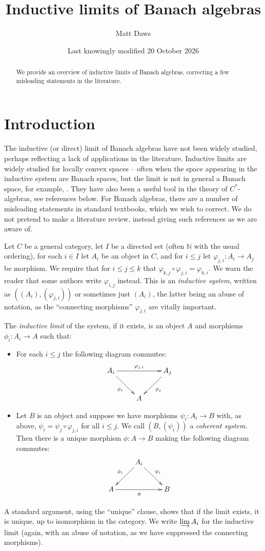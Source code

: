 \documentclass[a4paper,11pt]{article}
\title{Inductive limits of Banach algebras}
\author{Matt Daws}
\date{Last knowingly modified 20 October 2026}
\newcommand{\indlim}{\varinjlim}
\theoremstyle{definition}
\begin{document}
\maketitle

\begin{abstract}
We provide an overview of inductive limits of Banach algebras, correcting a few misleading
statements in the literature.
\end{abstract}

\tableofcontents

\section{Introduction}\label{sec:intro}

The inductive (or direct) limit of Banach algebras have not been widely studied, perhaps reflecting
a lack of applications in the literature.  Inductive limits are widely studied for locally convex
spaces -- often when the space appearing in the inductive system are Banach spaces, but the limit is
not in general a Banach space, for example, \cite[Chapter~IV, Section~5]{conway}.  They have also
been a useful tool in the theory of $C^*$-algebras, see references below.  For Banach algebras,
there are a number of misleading statements in standard textbooks, which we wish to correct.  We do
not pretend to make a literature review, instead giving such references as we are aware of.

Let $C$ be a general category, let $I$ be a directed set (often $\mathbb N$ with the usual
ordering), for each $i\in I$ let $A_i$ be an object in $C$, and for $i\leq j$ let $\varphi_{j,i}:
A_i\rightarrow A_j$ be morphism.  We require that for $i\leq j\leq k$ that $\varphi_{k,j} \circ
\varphi_{j,i} = \varphi_{k,i}$.  We warn the reader that some authors write $\varphi_{i,j}$
instead.  This is an \emph{inductive system}, written as $((A_i), (\varphi_{j,i}))$ or sometimes
just $(A_i)$, the latter being an abuse of notation, as the ``connecting morphisms'' $\varphi_{j,i}$
are vitally important.

The \emph{inductive limit} of the system, if it exists, is an object $A$ and morphisms $\phi_i:
A_i\rightarrow A$ such that:
\begin{itemize}
\item For each $i\leq j$ the following diagram commutes:
\[ \xymatrix{ A_i \ar[rr]^-{\varphi_{j,i}} \ar[rd]_{\phi_i} && A_j \ar[ld]^{\phi_j} \\
& A
} \]
\item Let $B$ is an object and suppose we have morphisms $\psi_i:A_i\rightarrow B$ with, as above,
$\psi_i = \psi_j \circ \varphi_{j,i}$ for all $i\leq j$.  We call $(B,(\psi_i))$ a \emph{coherent
system}.  Then there is a unique morphism
$\phi:A\rightarrow B$ making the following diagram commutes:
\[ \xymatrix{ & A_i \ar[ld]_{\phi_i} \ar[rd]^{\psi_i} \\
A \ar[rr]_{\phi} && B
} \]
\end{itemize}
A standard argument, using the ``unique'' clause, shows that if the limit exists, it is unique,
up to isomorphism in the category.  We write $\indlim A_i$ for the inductive limit (again, with an
abuse of notation, as we have suppressed the connecting morphisms).
\end{document}
